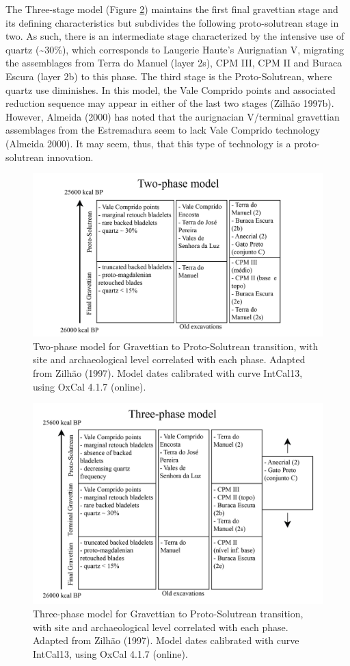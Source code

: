 \documentclass[12pt,twoside]{reedthesis}
\begin{document}
The Three-stage model (Figure \ref{fig:threephase}) maintains the first final gravettian stage and its defining characteristics but subdivides the following proto-solutrean stage in two. As such, there is an intermediate stage characterized by the intensive use of quartz (\textasciitilde30\%), which corresponds to Laugerie Haute's Aurignatian V, migrating the assemblages from Terra do Manuel (layer 2s), CPM III, CPM II and Buraca Escura (layer 2b) to this phase. The third stage is the Proto-Solutrean, where quartz use diminishes. In this model, the Vale Comprido points and associated reduction sequence may appear in either of the last two stages (Zilhão 1997b). However, Almeida (2000) has noted that the aurignacian V/terminal gravettian assemblages from the Estremadura seem to lack Vale Comprido technology (Almeida 2000). It may seem, thus, that this type of technology is a proto-solutrean innovation.
\begin{figure}[H]

{\centering \includegraphics[width=0.7\linewidth]{figure/Two-phasemodel} 

}

\caption{Two-phase model for Gravettian to Proto-Solutrean transition, with site and archaeological level correlated with each phase. Adapted from Zilhão (1997). Model dates calibrated with curve IntCal13, using OxCal 4.1.7 (online).}\label{fig:twophase}
\end{figure}
\begin{figure}[H]

{\centering \includegraphics[width=0.7\linewidth]{figure/Three-phasemodel} 

}

\caption{Three-phase model for Gravettian to Proto-Solutrean transition, with site and archaeological level correlated with each phase. Adapted from Zilhão (1997). Model dates calibrated with curve IntCal13, using OxCal 4.1.7 (online).}\label{fig:threephase}
\end{figure}
~
\end{document}
